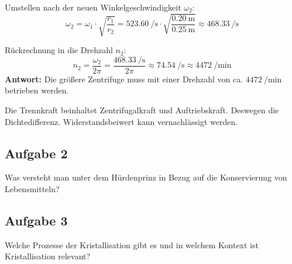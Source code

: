 \documentclass[a4paper,11pt]{article}
\newif\ifshowme
\begin{document}
{Umstellen nach der neuen Winkelgeschwindigkeit $\omega_2$:
\begin{equation*}
    \omega_2 = \omega_1 \cdot \sqrt{\frac{r_1}{r_2}} = \qty{523,60}{\per\second} \cdot \sqrt{\frac{\qty{0,20}{\metre}}{\qty{0,25}{\metre}}} \approx \qty{468,33}{\per\second}
\end{equation*}

Rückrechnung in die Drehzahl $n_2$:
\begin{equation*}
    n_2 = \frac{\omega_2}{2\pi} = \frac{\qty{468,33}{\per\second}}{2\pi} \approx \qty{74,54}{\per\second} \approx \qty{4472}{\per\minute}
\end{equation*}
\textbf{Antwort:} Die größere Zentrifuge muss mit einer Drehzahl von ca. $\qty{4472}{\per\minute}$ betrieben werden.


\ppbig
Die Trennkraft beinhaltet Zentrifugalkraft und Auftriebskraft. Deswegen die Dichtedifferenz. Widerstandsbeiwert kann vernachlässigt werden.

}
\else
\fi

\subsection*{Aufgabe 2}
Was versteht man unter dem Hürdenprinz in Bezug auf die Konservierung von Lebensmitteln?

\ifshowme
\antwort{
\begin{itemize}

\item mehrere milde Konservierungsmethoden, anstatt einer ''großen Hürde''
\item zum Schutz vor Mikroorganismen 
\item Temp, a$_w$, Säuregehalt, Sauerstoffentzug, konservierende Stoffe

\end{itemize}}
\else
\fi

\subsection*{Aufgabe 3}
Welche Prozesse der Kristallisation gibt es und in welchem Kontext ist Kristallisation relevant?

\ifshowme
\antwort{
\begin{itemize}
\item Kristallkeimildung: kritische minimale Größe, die dann wachsen 
\item Kristallwachstum 
\end{itemize}}
\else
\fi
\end{document}
